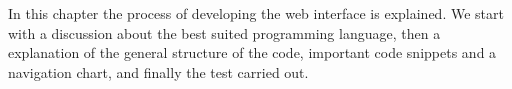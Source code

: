 In this chapter the process of developing the web interface is explained. We start with a discussion about the best suited programming language, then a explanation of the general structure of the code, important code snippets and a navigation chart, and finally the test carried out.
